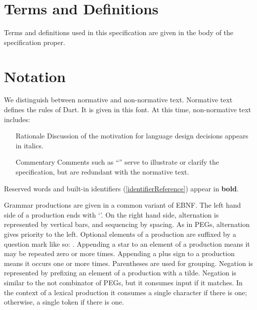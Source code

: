\documentclass[makeidx]{article}
\begin{document}
\section{Terms and Definitions}

\LMHash{}%
Terms and definitions used in this specification are given in
the body of the specification proper.


\section{Notation}

\LMHash{}%
We distinguish between normative and non-normative text.
Normative text defines the rules of Dart.
It is given in this font.
At this time, non-normative text includes:
\begin{itemize}
\item[Rationale]
  Discussion of the motivation for language design decisions appears in italics.
\item[Commentary]
  Comments such as
  ``''
  serve to illustrate or clarify the specification,
  but are redundant with the normative text.
\end{itemize}

\LMHash{}%
Reserved words and built-in identifiers
(\ref{identifierReference})
appear in {\bf bold}.


\LMHash{}%
Grammar productions are given in a common variant of EBNF.
The left hand side of a production ends with `\lit{::=}'.
On the right hand side, alternation is represented by vertical bars,
and sequencing by spacing.
As in PEGs, alternation gives priority to the left.
Optional elements of a production are suffixed by a question mark
like so: .
Appending a star to an element of a production means
it may be repeated zero or more times.
Appending a plus sign to a production means it occurs one or more times.
Parentheses are used for grouping.
Negation is represented by prefixing an element of a production with a tilde.
Negation is similar to the not combinator of PEGs,
but it consumes input if it matches.
In the context of a lexical production it consumes
a single character if there is one;
otherwise, a single token if there is one.
\end{document}
